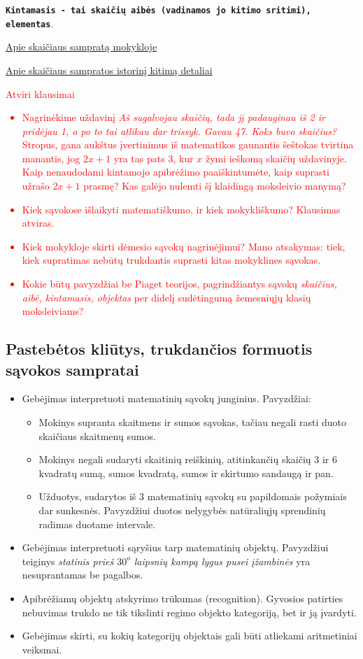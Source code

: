 \documentclass{article}
\begin{document}
\texttt{\textbf{Kintamasis - tai skaičių aibės (vadinamos jo kitimo sritimi), elementas}}.

\href{http://norvaisa.lt/matematika/mokykline-matematika/kas-yra-skaicius/}{Apie skaičiaus sampratą mokykloje}

\href{http://norvaisa.lt/matematika/kas-yra-matematika/iracionaliuju-skaiciu-priesistorija-2/}{Apie skaičiaus sampratos istorinį kitimą detaliai}

\textcolor{red}{
Atviri klausimai
\begin{itemize}
\item Nagrinėkime uždavinį \textit{Aš sugalvojau skaičių, tada jį padauginau iš 2 ir pridėjau 1, o po to tai atlikau dar trissyk. Gavau 47. Koks buvo skaičius?} Stropus, gana aukštus įvertinimus iš matematikos gaunantis šeštokas tvirtina manantis, jog $2x+1$ yra tas pats 3, kur $x$ žymi ieškomą skaičių uždavinyje. Kaip nenaudodami kintamojo apibrėžimo paaiškintumėte, kaip suprasti užrašo $2x+1$ prasmę? Kas galėjo nulemti šį klaidingą moksleivio manymą?
\item Kiek sąvokose išlaikyti matematiškumo, ir kiek mokykliškumo? Klausimas atviras.
\item Kiek mokykloje skirti dėmesio sąvokų nagrinėjimui? Mano atsakymas: tiek, kiek supratimas nebūtų trukdantis suprasti kitas mokyklines sąvokas.
\item Kokie būtų pavyzdžiai be Piaget teorijos, pagrindžiantys sąvokų \textit{skaičius, aibė, kintamasis, objektas} per didelį sudėtingumą žemesniųjų klasių moksleiviams?
\end{itemize}}

\subsection{Pastebėtos kliūtys, trukdančios formuotis sąvokos sampratai}
\begin{itemize}
\item Gebėjimas interpretuoti matematinių sąvokų junginius. Pavyzdžiai:
\begin{itemize}
\item Mokinys supranta skaitmens ir sumos sąvokas, tačiau negali rasti duoto skaičiaus skaitmenų sumos.
\item Mokinys negali sudaryti skaitinių reiškinių, atitinkančių skaičių 3 ir 6 kvadratų sumą, sumos kvadratą, sumos ir skirtumo sandaugą ir pan.
\item Užduotys, sudarytos iš 3 matematinių sąvokų su papildomais požymiais dar sunkesnės. Pavyzdžiui duotos nelygybės natūraliųjų sprendinių radimas duotame intervale.
\end{itemize}
\item Gebėjimas interpretuoti sąryšius tarp matematinių objektų. Pavyzdžiui teiginys \textit{statinis prieš $30^o$ laipsnių kampą lygus pusei įžambinės} yra nesuprantamas be pagalbos.
\item Apibrėžiamų objektų atskyrimo trūkumas (recognition).  Gyvosios patirties nebuvimas trukdo ne tik tikslinti regimo objekto kategoriją, bet ir ją įvardyti. 
\item Gebėjimas skirti, su kokių kategorijų objektais gali būti atliekami aritmetiniai veiksmai. 
\end{itemize}
\end{document}
